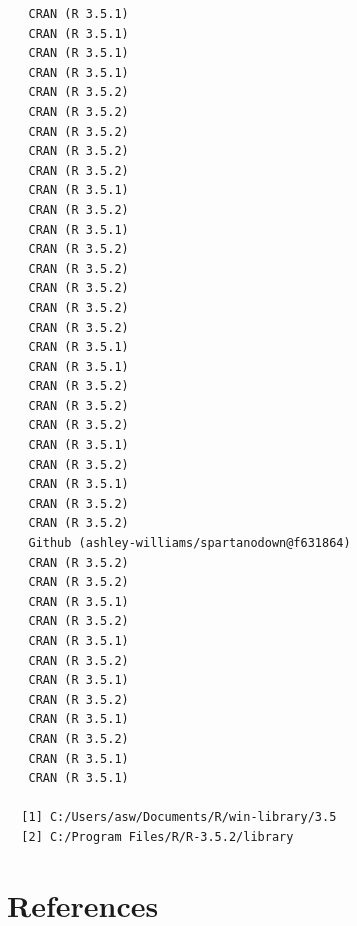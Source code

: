 \documentclass[ms]{uncgdissertationexp}
\theoremstyle{plain}
\theoremstyle{definition}
\theoremstyle{remark}
\begin{document}
\begin{verbatim}
   CRAN (R 3.5.1)                               
   CRAN (R 3.5.1)                               
   CRAN (R 3.5.1)                               
   CRAN (R 3.5.1)                               
   CRAN (R 3.5.2)                               
   CRAN (R 3.5.2)                               
   CRAN (R 3.5.2)                               
   CRAN (R 3.5.2)                               
   CRAN (R 3.5.2)                               
   CRAN (R 3.5.1)                               
   CRAN (R 3.5.2)                               
   CRAN (R 3.5.1)                               
   CRAN (R 3.5.2)                               
   CRAN (R 3.5.2)                               
   CRAN (R 3.5.2)                               
   CRAN (R 3.5.2)                               
   CRAN (R 3.5.2)                               
   CRAN (R 3.5.1)                               
   CRAN (R 3.5.1)                               
   CRAN (R 3.5.2)                               
   CRAN (R 3.5.2)                               
   CRAN (R 3.5.2)                               
   CRAN (R 3.5.1)                               
   CRAN (R 3.5.2)                               
   CRAN (R 3.5.1)                               
   CRAN (R 3.5.2)                               
   CRAN (R 3.5.2)                               
   Github (ashley-williams/spartanodown@f631864)
   CRAN (R 3.5.2)                               
   CRAN (R 3.5.2)                               
   CRAN (R 3.5.1)                               
   CRAN (R 3.5.2)                               
   CRAN (R 3.5.1)                               
   CRAN (R 3.5.2)                               
   CRAN (R 3.5.1)                               
   CRAN (R 3.5.2)                               
   CRAN (R 3.5.1)                               
   CRAN (R 3.5.2)                               
   CRAN (R 3.5.1)                               
   CRAN (R 3.5.1)                               
  
  [1] C:/Users/asw/Documents/R/win-library/3.5
  [2] C:/Program Files/R/R-3.5.2/library
  \end{verbatim}
  \backmatter
  
  \chapter*{References}\label{references}
  
  \noindent
  
  \setlength{\parindent}{-0.20in} \setlength{\leftskip}{0.20in}
  \setlength{\parskip}{8pt}
  
\end{document}
